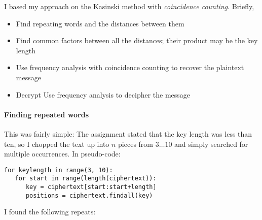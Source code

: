 \documentclass[a4paper,english,12pt]{article}
\begin{document}
I based my approach on the Kasinski method with \textit{coincidence counting}. Briefly,

\begin{itemize}
  \item Find repeating words and the distances between them
  \item Find common factors between all the distances; their product may be the
    key length
  \item Use frequency analysis with coincidence counting to recover the
    plaintext message
  \item Decrypt Use frequency analysis to decipher the message
\end{itemize}

\paragraph{Finding repeated words}

This was fairly simple: The assignment stated that the key length was less than
ten, so I chopped the text up into $n$ pieces from $3\dots10$ and simply
searched for multiple occurrences. In pseudo-code:

\begin{verbatim}
for keylength in range(3, 10):
   for start in range(length(ciphertext)):
      key = ciphertext[start:start+length]
      positions = ciphertext.findall(key)
\end{verbatim}

I found the following repeats:
\end{document}
